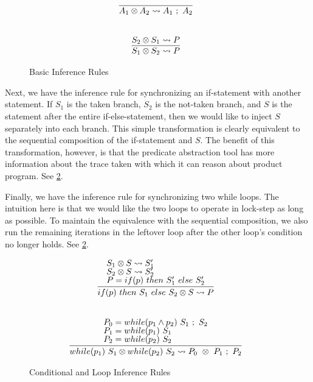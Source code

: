 \documentclass[letterpaper,twocolumn,10pt]{article}
\newcommand{\cross}{\otimes{}}
\begin{document}
\begin{figure}
    \caption{Basic Inference Rules}
    \label{fig:infrules1}
    \[
		\begin{array}{c}
			\infer[]{A_1 \cross A_2 \leadsto A_1\ ;\ A_2}{} \\ \\ \\
			\infer[]{S_1 \cross S_2 \leadsto P}{
				S_2 \cross S_1 \leadsto P
			}
        \end{array}
    \]
\end{figure}

Next, we have the inference rule for synchronizing an if-statement with another statement. If $S_1$ is the taken branch, $S_2$ is the not-taken branch, and $S$ is the statement after the entire if-else-statement, then we would like to inject $S$ separately into each branch. This simple transformation is clearly equivalent to the sequential composition of the if-statement and $S$. The benefit of this transformation, however, is that the predicate abstraction tool has more information about the trace taken with which it can reason about product program. See \ref{fig:infrules2}.

Finally, we have the inference rule for synchronizing two while loops. The intuition here is that we would like the two loops to operate in lock-step as long as possible. To maintain the equivalence with the sequential composition, we also run the remaining iterations in the leftover loop after the other loop's condition no longer holds. See \ref{fig:infrules2}.

\begin{figure}
    \caption{Conditional and Loop Inference Rules}
    \label{fig:infrules2}
    \[
		\begin{array}{c}
			\infer[]{if(p)\ then\ S_1\ else\ S_2 \cross S \leadsto P}{
				\text{$S_1 \cross S \leadsto S_1'$} \\
				\text{$S_2 \cross S \leadsto S_2'$} \\
				\text{$P = if(p)\ then\ S_1'\ else\ S_2'$}
			} \\ \\ \\
			\infer[]{while(p_1)\ S_1 \cross while(p_2)\ S_2 \leadsto P_0\ \cross\ P_1\ ;\ P_2}{
				\text{$P_0 = while(p_1 \land p_2)\ S_1\ ;\ S_2$} \\
				\text{$P_1 = while(p_1)\ S_1$} \\
				\text{$P_2 = while(p_2)\ S_2$}
			}
        \end{array}
    \]
\end{figure}
\end{document}
